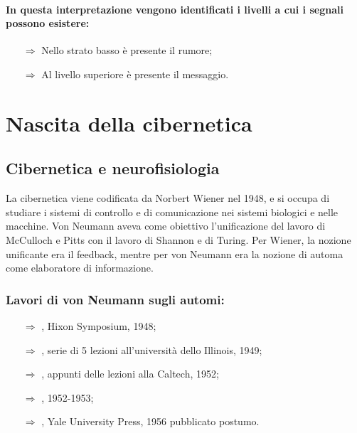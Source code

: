 \paragraph{In questa interpretazione vengono identificati i livelli a cui i segnali possono esistere:}
\begin{itemize}
    \item [$\Rightarrow$] Nello strato basso è presente il rumore;
    \item [$\Rightarrow$] Al livello superiore è presente il messaggio.
\end{itemize}

\section{Nascita della cibernetica}

\subsection{Cibernetica e neurofisiologia}

La cibernetica viene codificata da Norbert Wiener nel 1948, e si occupa di studiare i sistemi di controllo e di comunicazione nei sistemi biologici 
e nelle macchine.
Von Neumann aveva come obiettivo l'unificazione del lavoro di McCulloch e Pitts con il lavoro di Shannon e di Turing. Per Wiener,
la nozione unificante era il feedback, mentre per von Neumann era la nozione di automa come
elaboratore di informazione.

\subsubsection{Lavori di von Neumann sugli automi:}

\begin{itemize}
    \item [$\Rightarrow$] , Hixon Symposium, 1948;
    \item [$\Rightarrow$] , serie di 5 lezioni all'università dello Illinois, 1949;
    \item [$\Rightarrow$] , appunti delle lezioni alla Caltech, 1952;
    \item [$\Rightarrow$] , 1952-1953;
    \item [$\Rightarrow$] , Yale University Press, 1956 pubblicato postumo.
\end{itemize}

